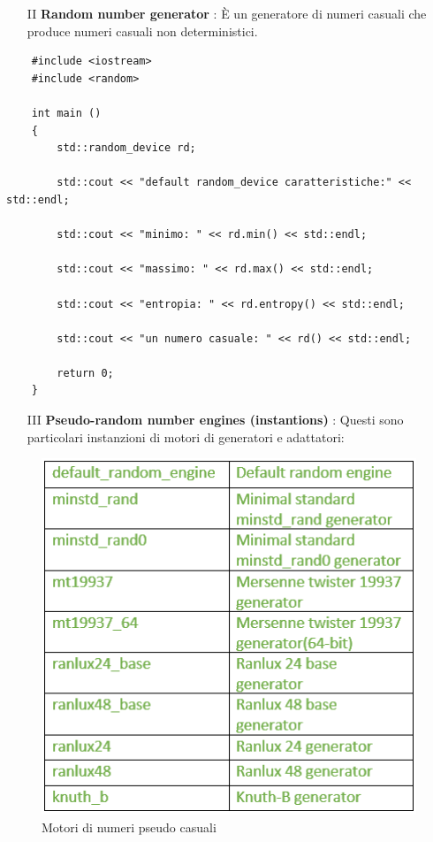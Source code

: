 \begin{enumerate}[I]
	\item[II] \textsf{\small \textbf{Random number generator} : È un generatore di numeri casuali che produce numeri casuali non deterministici.} \\
\end{enumerate}

\begin{lstlisting}
	#include <iostream>
	#include <random>
	
	int main ()
	{
		std::random_device rd;
		
		std::cout << "default random_device caratteristiche:" << std::endl;
		
		std::cout << "minimo: " << rd.min() << std::endl;
		
		std::cout << "massimo: " << rd.max() << std::endl;
		
		std::cout << "entropia: " << rd.entropy() << std::endl;
		
		std::cout << "un numero casuale: " << rd() << std::endl;
		
		return 0;
	}
\end{lstlisting}

\begin{enumerate}[I]
	\item[III] \textsf{\small \textbf{Pseudo-random number engines (instantions)} : Questi sono particolari instanzioni di motori di generatori e adattatori: } \\
\end{enumerate}

\begin{figure}[H]
	\centering
	\includegraphics[width=1\textwidth, height=1\textheight, keepaspectratio]{./imgs/pseudo-random-number-engines.png}
	\caption{Motori di numeri pseudo casuali}
	\label{fig:pseudo-random-number-engines}
\end{figure}

